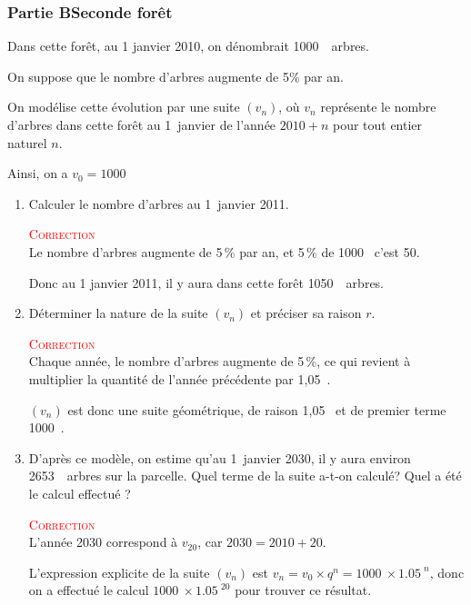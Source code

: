 \documentclass[10pt]{article}
\providecommand{\np}[2][]{{#2~#1}}
\begin{document}
\subsubsection*{Partie B\hspace{10mm}Seconde forêt}


Dans cette forêt, au 1 janvier 2010, on dénombrait \np{1000}~arbres.

On suppose que le nombre d'arbres augmente de 5\% par an.

On modélise cette évolution par une suite \mbox{$(v_n)$}, où $v_n$ représente le nombre d'arbres dans cette forêt au 1~janvier de l'année \mbox{$2010+n$} pour tout entier naturel $n$.

Ainsi, on a \mbox{$v_0=\np{1000}$}

\begin{enumerate}
	\item Calculer le nombre d'arbres au 1~janvier 2011.


		\textcolor{red}{\textsc{Correction}}\\
		Le nombre d'arbres augmente de 5\,\% par an, et 5\,\% de \np{1000} c'est 50.

		Donc au 1 janvier 2011, il y aura dans cette forêt \np{1050}~arbres.
	\item Déterminer la nature de la suite \mbox{$(v_n)$} et préciser sa raison $r$.

		\textcolor{red}{\textsc{Correction}}\\
		Chaque année, le nombre d'arbres augmente de 5\,\%, ce qui revient à multiplier la quantité de l'année précédente par \np{1,05}.

		$(v_n)$ est donc une suite géométrique, de raison \np{1,05} et de premier terme \np{1000}.
	\item D'après ce modèle, on estime qu'au 1~janvier 2030, il y aura environ \np{2653}~arbres sur la parcelle. Quel terme de la suite a-t-on calculé? Quel a été le calcul effectué ?

		\textcolor{red}{\textsc{Correction}}\\
		L'année 2030 correspond à \mbox{$v_{20}$}, car \mbox{$2030=2010+20$.}


		L'expression explicite de la suite \mbox{$(v_n)$} est \mbox{$v_n=v_0\times q^n= \np{1000}\times \np{1.05}^n$}, donc on a effectué le calcul \mbox{$\np{1000}\times\np{1.05}^{20}$} pour trouver ce résultat.
\end{enumerate}
\end{document}
